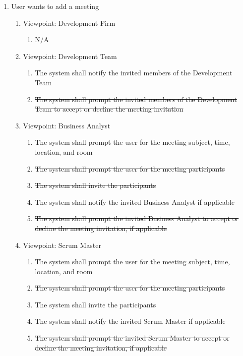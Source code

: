 \documentclass[12pt, titlepage]{article}
\begin{document}
\begin{enumerate}[{BE}1.]
    \item User wants to add a meeting %
    \begin{enumerate}[{VP}1.] 
        \item Viewpoint: Development Firm
            \begin{enumerate}
                \item[] N/A
            \end{enumerate}
        \item Viewpoint: Development Team
            \begin{enumerate}
                \item The system shall notify the invited members of the Development Team
                \item \sout{The system shall prompt the invited members of the Development Team to accept or decline the meeting invitation}
            \end{enumerate}
        \item Viewpoint: Business Analyst
            \begin{enumerate}
                \item The system shall prompt the user for the meeting subject, time, location, and room
                \item \sout{The system shall prompt the user for the meeting participants}
                \item \sout{The system shall invite the participants}
                \item The system shall notify the invited Business Analyst if applicable
                \item \sout{The system shall prompt the invited Business Analyst to accept or decline the meeting invitation, if applicable}
            \end{enumerate}
        \item Viewpoint: Scrum Master
            \begin{enumerate}
                \item The system shall prompt the user for the meeting subject, time, location, and room
                \item \sout{The system shall prompt the user for the meeting participants}
                \item The system shall invite the participants
                \item The system shall notify the \sout{invited} Scrum Master if applicable
                \item \sout{The system shall prompt the invited Scrum Master to accept or decline the meeting invitation, if applicable}
            \end{enumerate}
    \end{enumerate}
    

\end{enumerate}
\end{document}
